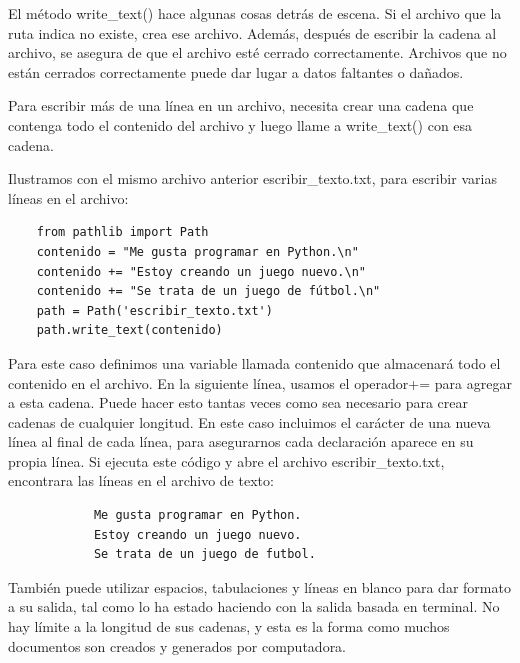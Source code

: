 El método  {\ttfamily write\_text()} hace algunas cosas detrás de escena. Si el archivo que
la ruta indica no existe, crea ese archivo. Además, después de escribir la cadena
al archivo, se asegura de que el archivo esté cerrado correctamente. Archivos que no están cerrados
correctamente puede dar lugar a datos faltantes o dañados.

Para escribir más de una línea en un archivo, necesita crear una cadena que contenga
todo el contenido del archivo y luego llame a  {\ttfamily write\_text()} con esa cadena.

Ilustramos con el mismo archivo anterior {\ttfamily escribir\_texto.txt}, para escribir varias líneas en el archivo:

\begin{lstlisting}
	from pathlib import Path
	contenido = "Me gusta programar en Python.\n"
	contenido += "Estoy creando un juego nuevo.\n"
	contenido += "Se trata de un juego de fútbol.\n"
	path = Path('escribir_texto.txt')
	path.write_text(contenido)
\end{lstlisting}

Para este caso definimos una variable llamada {\ttfamily contenido} que almacenará todo el contenido en el
archivo. En la siguiente línea, usamos el operador{\ttfamily += } para agregar a esta cadena. 
Puede hacer esto tantas veces como sea necesario para crear cadenas de cualquier longitud.
En este caso incluimos el carácter de una nueva línea al final de cada línea, para asegurarnos
cada declaración aparece en su propia línea. Si ejecuta este código y  abre el archivo  {\ttfamily escribir\_texto.txt}, encontrara las líneas en el archivo de texto:

{\ttfamily\scriptsize\scriptsize 	
	{\color{black} 	
		\begin{verbatim}
			Me gusta programar en Python.
			Estoy creando un juego nuevo.
			Se trata de un juego de futbol.		
		\end{verbatim}
}}


También puede utilizar espacios, tabulaciones y líneas en blanco para dar formato a su
salida, tal como lo ha estado haciendo con la salida basada en terminal. No hay
límite a la longitud de sus cadenas, y esta es la forma como muchos documentos son creados 
y generados por computadora.




